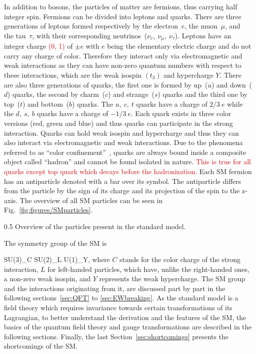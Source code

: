 In addition  to bosons, the particles of matter are fermions, thus carrying half integer spin. Fermions can be divided into leptons and quarks. There are three generations of leptons formed respectively by the electron~$e$, the muon~$\mu$, and the tau~$\tau$, with their corresponding neutrinos~($\nu_{e},~\nu_{\mu},~\nu_{\tau}$). Leptons have an integer charge \textcolor{red}{(0, 1)} of $\pm e$ with $e$ being the elementary electric charge and do not carry any charge of color. Therefore they interact only via electromagnetic and weak interactions as they can have non-zero quantum numbers with respect to these interactions, which are the weak isospin $(t_{3})$ and hypercharge $Y$. There are also three generations of quarks, the first one is formed by up~($u$) and down~($d$) quarks, the second by charm~($c$) and strange~($s$) quarks and the third one by top~($t$) and bottom~($b$) quarks. The $u,~c,~t$ quarks have a charge of $2/3~e$ while the $d,~s,~b$ quarks have a charge of $-1/3~e$. Each quark exists in three color versions (red, green and blue) and thus quarks can participate in the strong interaction. Quarks can hold weak isospin and hypercharge and thus they can also interact via electromagnetic and weak interactions. Due to the phenomena referred to as ``color confinement''~\cite{Alkofer:2006fu}, quarks are always bound inside a composite object called ``hadron'' and cannot be found isolated in nature. \textcolor{red}{This is true for all quarks except top quark which decays before the hadronization.} Each SM fermion has an antiparticle denoted with a bar over its symbol. The antiparticle differs from the particle by the sign of its charge and its projection of the spin to the z-axis. The overview of all SM particles can be seen in Fig.~\ref{fig:figures/SMparticles}.



                 {0.5}       %
                 { Overview of the particles present in the standard model.}

The symmetry group of the SM is

{
SU(3)_{C} \otimes SU(2)_{L} \otimes U(1)_{Y},
}
where $C$ stands for the color charge of the strong interaction, $L$ for left-handed particles, which have, unlike the right-handed ones, a non-zero weak isospin, and $Y$ represents the weak hypercharge. The SM group and the interactions originating from it, are discussed part by part in the following sections~\ref{sec:QFT} to \ref{sec:EWbreaking}. As the standard model is a field theory which requires invariance towards certain transformations of its Lagrangian, to better understand the derivation and the features of the SM, the basics of the quantum field theory and gauge transformations are described in the following sections. Finally, the last Section~\ref{sec:shortcomings} presents the shortcomings of the SM.





